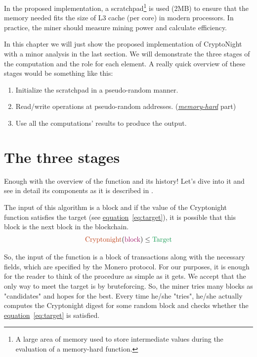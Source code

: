 In the proposed implementation, a scratchpad\footnote{A large area of memory used to store intermediate values during the evaluation of a memory-hard function.} is used (2MB) to ensure that the memory needed fits the size of L3 cache (per core) in modern processors. In practice, the miner should measure mining power and calculate efficiency.

In this chapter we will just show the proposed implementation of CryptoNight with a minor analysis in the last section. We will demonstrate the three stages of the computation and the role for each element. A really quick overview of these stages would be something like this:

\begin{enumerate}
  \item Initialize the scratchpad in a pseudo-random manner.
  \item Read/write operations at pseudo-random addresses. (\hyperref[sec:memory-hard]{\emph{memory-hard}} part)
  \item Use all the computations' results to produce the output.
\end{enumerate}

\section{The three stages}
Enough with the overview of the function and its history! Let's dive into it and see in detail its components as it is described in \cite{cryptonight}.

The input of this algorithm is a block and if the value of the Cryptonight function satisfies the target (see \hyperref[eq:target]{equation}~\ref{eq:target}), it is possible that this block is the next block in the blockchain.
\begin{equation}
  \label{eq:target}
  \color{Bittersweet} \mbox{Cryptonight}
  \color{black} (
  \color{RedViolet} \mbox{block}
  \color{black} )\leq
  \color{ForestGreen} \mbox{Target}
  \color{black}
\end{equation}

So, the input of the function is a block of transactions along with the necessary fields, which are specified by the Monero protocol. For our purposes, it is enough for the reader to think of the procedure as simple as it gets. We accept that the only way to meet the target is by bruteforcing. So, the miner tries many blocks as "candidates" and hopes for the best. Every time he/she "tries", he/she actually computes the Cryptonight digest for some random block and checks whether the \hyperref[eq:target]{equation}~\ref{eq:target} is satisfied.

